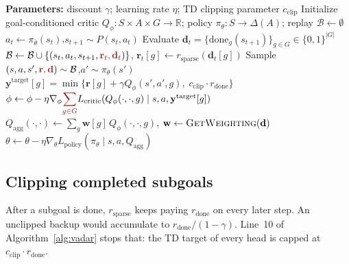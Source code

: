 \documentclass[11pt]{article}
\newcommand{\vadar}[1]{\textcolor{vadarred}{#1}}
\newcommand{\R}{\mathbb{R}}
\begin{document}
\begin{algorithm}[t]
\caption{Value disaggregation (VaDar)}
\label{alg:vadar}
\begin{algorithmic}[1]
\State \textbf{Parameters:} discount $\gamma$; learning rate $\eta$; TD clipping parameter $c_{\mathrm{clip}}$
\State Initialize goal-conditioned critic $Q_\phi:S\times A\times G\to\R$;\;
       policy $\pi_\theta:S\to\Delta(A)$;\;
       replay $\mathcal{B}\leftarrow\emptyset$
    \State $a_t\leftarrow\pi_{\bar\theta}(s_t)$,\quad $s_{t+1}\sim P(s_t,a_t)$
    \State \vadar{Evaluate $\mathbf{d}_t=\{\mathrm{done}_g(s_{t+1})\}_{g\in G}\in\{0,1\}^{|G|}$}
    \State $\mathcal{B}\leftarrow\mathcal{B}\cup\{(s_t,a_t,s_{t+1},\vadar{\mathbf{r}_t,\mathbf{d}_t})\}$,\quad
           \vadar{$\mathbf{r}_t[g]\leftarrow r_{\mathrm{sparse}}(\mathbf{d}_t[g])$}
      \State Sample $(s,a,s',\vadar{\mathbf{r},\mathbf{d}})\sim\mathcal{B}$,\quad $a'\sim\pi_\theta(s')$
      \State \vadar{$\mathbf{y}^{\mathrm{target}}[g]
            =\min\{\mathbf{r}[g]+\gamma Q_\phi(s',a',g),\; c_{\mathrm{clip}}\cdot r_{\mathrm{done}}\}$}
      \State $\phi\leftarrow\phi-\eta\nabla_\phi
            \vadar{\displaystyle\sum_{g\in G}}
            L_{\mathrm{critic}}\!\left(Q_\phi(\cdot,\cdot,g)\mid s,a,\mathbf{y}^{\mathrm{target}}[g]\right)$
      \State \vadar{$Q_{\mathrm{agg}}(\cdot,\cdot)\leftarrow\sum_g \mathbf{w}[g]\,Q_\phi(\cdot,\cdot,g)$},\;
            \vadar{$\mathbf{w}\leftarrow\textsc{GetWeighting}(\mathbf{d})$}
      \State $\theta\leftarrow\theta-\eta\nabla_\theta L_{\mathrm{policy}}(\pi_\theta\mid s,a,Q_{\mathrm{agg}})$
    \EndFor
  \EndWhile
\EndFor
\end{algorithmic}
\end{algorithm}

\subsection{Clipping completed subgoals}
After a subgoal is done, $r_{\mathrm{sparse}}$ keeps paying $r_{\mathrm{done}}$ on every later step.
An unclipped backup would accumulate to $r_{\mathrm{done}}/(1-\gamma)$.
Line~10 of Algorithm~\ref{alg:vadar} stops that: the TD target of every head is capped at $c_{\mathrm{clip}}\cdot r_{\mathrm{done}}$.
\end{document}
